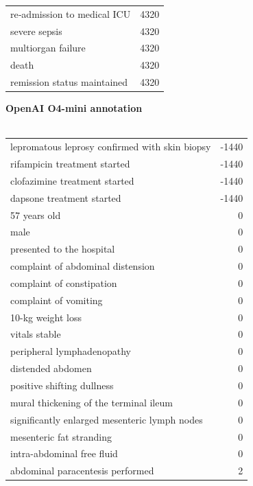 \begin{figure}[!htbp]
\begin{minipage}[!htbp]{0.49\textwidth}
\begin{tabular}{P{0.75\textwidth}r}
            re‑admission to medical ICU & 4320 \\
            severe sepsis & 4320 \\
            multiorgan failure & 4320 \\
            death & 4320 \\
            remission status maintained & 4320
        \end{tabular}
    \end{minipage}
    \begin{minipage}[!htbp]{0.49\textwidth}
    \footnotesize
        \textbf{OpenAI O4-mini annotation} \\ \\
        \footnotesize
        \begin{tabular}{P{0.75\textwidth}r}
            lepromatous leprosy confirmed with skin biopsy & -1440 \\  
            rifampicin treatment started & -1440 \\  
            clofazimine treatment started & -1440 \\  
            dapsone treatment started & -1440 \\  
            57 years old & 0 \\  
            male & 0 \\ 
            presented to the hospital & 0 \\  
            complaint of abdominal distension & 0 \\  
            complaint of constipation & 0 \\  
            complaint of vomiting & 0 \\  
            10-kg weight loss & 0 \\  
            vitals stable & 0 \\  
            peripheral lymphadenopathy & 0 \\  
            distended abdomen & 0 \\  
            positive shifting dullness & 0 \\  
            mural thickening of the terminal ileum & 0 \\  
            significantly enlarged mesenteric lymph nodes & 0 \\  
            mesenteric fat stranding & 0 \\  
            intra-abdominal free fluid & 0 \\  
            abdominal paracentesis performed & 2 \\ 

\end{tabular}
\end{minipage}
\end{figure}
